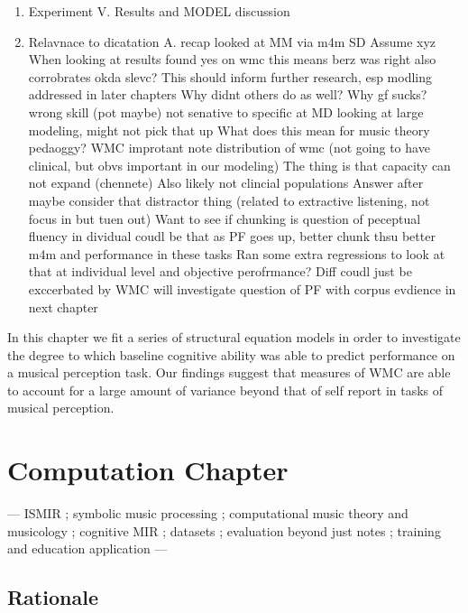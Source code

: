 \documentclass[]{book}
\begin{document}
\begin{enumerate}
\def\labelenumi{\Roman{enumi}.}
\setcounter{enumi}{3}
\item
  Experiment
  V. Results and MODEL discussion
\item
  Relavnace to dicatation
  A. recap looked at MM via m4m SD
  Assume xyz
  When looking at results found yes on wmc
  this means berz was right
  also corrobrates okda slevc?
  This should inform further research, esp modling addressed in later chapters
  Why didnt others do as well?
  Why gf sucks? wrong skill (pot maybe)
  not senative to specific at MD
  looking at large modeling, might not pick that up
  What does this mean for music theory pedaoggy?
  WMC improtant
  note distribution of wmc (not going to have clinical, but obvs important in our modeling)
  The thing is that capacity can not expand (chennete)
  Also likely not clincial populations
  Answer after maybe consider that distractor thing (related to extractive listening, not focus in but tuen out)
  Want to see if chunking is question of peceptual fluency in dividual
  coudl be that as PF goes up, better chunk
  thsu better m4m and performance in these tasks
  Ran some extra regressions to look at that at individual level and objective perofrmance?
  Diff coudl just be exccerbated by WMC
  will investigate question of PF with corpus evdience in next chapter
\end{enumerate}

In this chapter we fit a series of structural equation models in order to investigate the degree to which baseline cognitive ability was able to predict performance on a musical perception task.
Our findings suggest that measures of WMC are able to account for a large amount of variance beyond that of self report in tasks of musical perception.

\hypertarget{computation-chapter}{%
\chapter{Computation Chapter}\label{computation-chapter}}

--- ISMIR
; symbolic music processing
; computational music theory and musicology
; cognitive MIR
; datasets
; evaluation beyond just notes
; training and education application
---

\hypertarget{rationale-2}{%
\section{Rationale}\label{rationale-2}}
\end{document}
